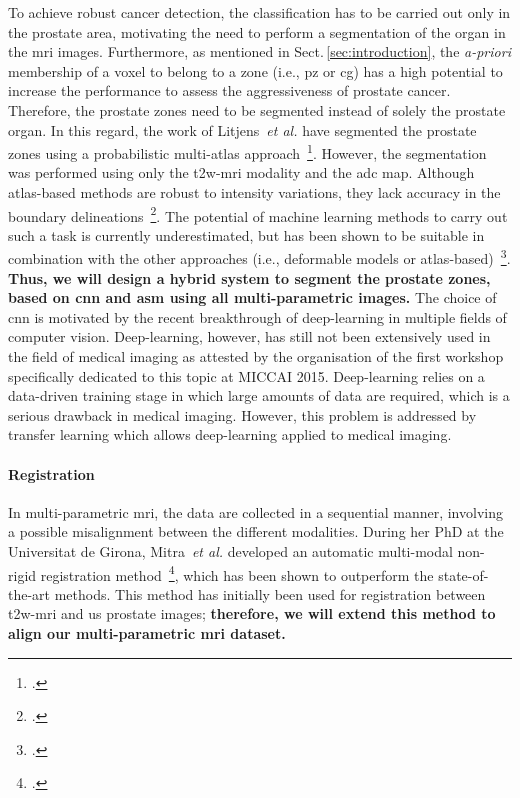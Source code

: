 To achieve robust cancer detection, the classification has to be carried out only in the prostate area, motivating the need to perform a segmentation of the organ in the \ac{mri} images.
Furthermore, as mentioned in Sect.\,\ref{sec:introduction}, the \emph{a-priori} membership of a voxel to belong to a zone (i.e., \ac{pz} or \ac{cg}) has a high potential to increase the performance to assess the aggressiveness of prostate cancer.
Therefore, the prostate zones need to be segmented instead of solely the prostate organ.
In this regard, the work of Litjens~\emph{et al.} have segmented the prostate zones using a probabilistic multi-atlas approach~\footcite{Litjens2014a}.
However, the segmentation was performed using only the \ac{t2w}-\ac{mri} modality and the \ac{adc} map.
Although atlas-based methods are robust to intensity variations, they lack accuracy in the boundary delineations~\footcite{Ghose2012}.
The potential of machine learning methods to carry out such a task is currently underestimated, but has been shown to be suitable in combination with the other approaches (i.e., deformable models or atlas-based)~\footcite{ghose2012graph}.
\textbf{Thus, we will design a hybrid system to segment the prostate zones, based on \ac{cnn} and \ac{asm} using all multi-parametric images.}
The choice of \ac{cnn} is motivated by the recent breakthrough of deep-learning in multiple fields of computer vision.
Deep-learning, however, has still not been extensively used in the field of medical imaging as attested by the organisation of the first workshop specifically dedicated to this topic at MICCAI 2015. 
Deep-learning relies on a data-driven training stage in which large amounts of data are required, which is a serious drawback in medical imaging.
However, this problem is addressed by transfer learning which allows deep-learning applied to medical imaging.

\paragraph{Registration}

In multi-parametric \ac{mri}, the data are collected in a sequential manner, involving a possible misalignment between the different modalities.
During her PhD at the Universitat de Girona, Mitra~\emph{et al.} developed an automatic multi-modal non-rigid registration method~\footcite{Mitra2012a}, which has been shown to outperform the state-of-the-art methods.
This method has initially been used for registration between \ac{t2w}-\ac{mri} and \ac{us} prostate images; \textbf{therefore, we will extend this method to align our multi-parametric \ac{mri} dataset.}

